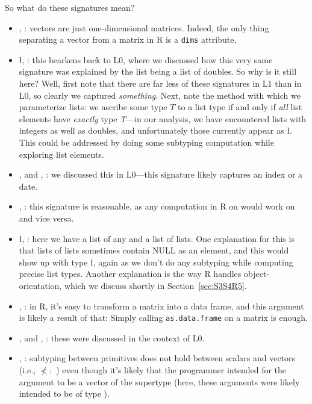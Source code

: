 \documentclass[acmsmall,10pt,review,anonymous]{acmart}\settopmatter{printfolios=true,printccs=false,printacmref=false}
\newcommand{\code}[1]{\lstinline|#1|\xspace}
\begin{document}
So what do these signatures mean?

\begin{itemize}
	\item \D, : vectors are just one-dimensional matrices.
	Indeed, the only thing separating a vector from a matrix in R is a {\tt dims} attribute.
	
	\item \l, : this hearkens back to L0, where we discussed how this very same signature was explained by the list being a list of doubles.
	So why is it still here?
	Well, first note that there are far less of these signatures in L1 than in L0, so clearly we captured {\it something}.
	Next, note the method with which we parameterize lists: we ascribe some type $T$ to a list type  if and only if {\it all} list elements have {\it exactly} type {\it T}---in our analysis, we have encountered lists with integers as well as doubles, and unfortunately those currently appear as \l.
	This could be addressed by doing some subtyping computation while exploring list elements.
	
	\item \sC, \sD and \C, \D: we discussed this in L0---this signature likely captures an index or a date.
	
	\item {}, : this signature is reasonable, as any computation in R on  would work on  and vice versa.
	
	\item \l, : here we have a list of any and a list of lists.
	One explanation for this is that lists of lists sometimes contain NULL as an element, and this would show up with type \l, again as we don't do any subtyping while computing precise list types.
	Another explanation is the way R handles object-orientation, which we discuss shortly in Section~\ref{sec:S3S4R5}.
	
	\item \df, : in R, it's easy to transform a matrix into a data frame, and this argument is likely a result of that:
	Simply calling \code{as.data.frame} on a matrix is enough.
	
	\item \sD, \sF and \sC, \sF: these were discussed in the context of L0.
	
	\item \I, \sD: subtyping between primitives does not hold between scalars and vectors (i.e., \I $\not<:$ \sD) even though it's likely that the programmer intended for the argument to be a vector of the supertype (here, these arguments were likely intended to be of type \D).
	
\end{itemize}
\end{document}
